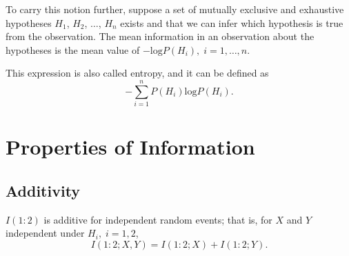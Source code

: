 \documentclass[twocolumn]{article}
\theoremstyle{plain}
\begin{document}
To carry this notion further, suppose a set of mutually exclusive and exhaustive hypotheses $H_1$, $H_2$, $\dots$, $H_n$ exists and that we can infer which hypothesis is true from the observation. The mean information in an observation about the hypotheses is the mean value of $-\text{log}P(H_i), \; i=1,\dots,n$.

This expression is also called entropy, and it can be defined as
\begin{equation}
    -\sum_{i = 1}^{n}{P(H_i)\text{log}P(H_i)}.
\end{equation}

\section{Properties of Information}

\subsection{Additivity}

$I(1:2)$ is additive for independent random events; that is, for $X$ and $Y$ independent under $H_i , \; i = 1,2$,
\begin{equation}
    I(1:2;X,Y)= I(1:2;X)+I(1:2;Y).
\end{equation}
\end{document}
